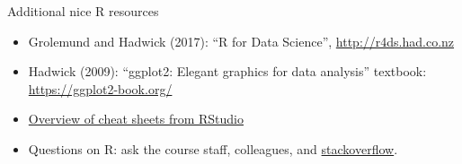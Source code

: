 \documentclass[
  10pt,
  ignorenonframetext,
]{beamer}
\providecommand{\tightlist}{%
  \setlength{\itemsep}{0pt}\setlength{\parskip}{0pt}}
\begin{document}
\begin{frame}
\begin{block}{Additional nice R resources}
\protect\hypertarget{additional-nice-r-resources}{}
\(~\)

\begin{itemize}
\tightlist
\item
  Grolemund and Hadwick (2017): ``R for Data Science'',
  \url{http://r4ds.had.co.nz}
\end{itemize}

\vspace{2mm}

\begin{itemize}
\tightlist
\item
  Hadwick (2009): ``ggplot2: Elegant graphics for data analysis''
  textbook: \url{https://ggplot2-book.org/}
\end{itemize}

\vspace{2mm}

\begin{itemize}
\tightlist
\item
  \href{https://www.rstudio.com/resources/cheatsheets/}{Overview of
  cheat sheets from RStudio}
\end{itemize}

\vspace{2mm}

\begin{itemize}
\tightlist
\item
  Questions on R: ask the course staff, colleagues, and
  \href{https://stackoverflow.com/}{stackoverflow}.
\end{itemize}
\end{block}
\end{frame}
\end{document}
